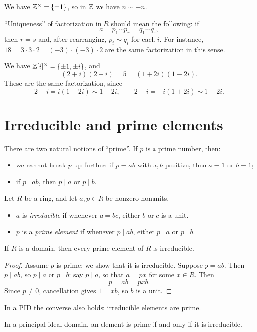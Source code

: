 \documentclass[reqno,11pt]{amsart}
\begin{document}
\begin{example}
We have $\mathbb{Z}^\times=\{\pm1\}$, so in $\mathbb{Z}$ we have $n\sim-n$.
\end{example}

``Uniqueness'' of factorization in $R$ should mean the following:
if
\[
  a=p_1\cdots p_r=q_1\cdots q_s,
\]
then $r=s$ and, after rearranging, $p_i\sim q_i$ for each $i$.
For instance, $18=3\cdot3\cdot2=(-3)\cdot(-3)\cdot2$ are the
same factorization in this sense.

\begin{example}
We have $\mathbb{Z}[i]^\times=\{\pm1,\pm i\}$, and
\[
  (2+i)(2-i)=5=(1+2i)(1-2i).
\]
These are the same factorization, since
\[
  2+i=i(1-2i)\sim1-2i,\qquad 2-i=-i(1+2i)\sim1+2i.
\]
\end{example}

\section{Irreducible and prime elements}

There are two natural notions of ``prime''. If $p$ is a prime
number, then:
\begin{itemize}
  \item we cannot break $p$ up further: if $p=ab$ with $a,b$
  positive, then $a=1$ or $b=1$;
  \item if $p\mid ab$, then $p\mid a$ or $p\mid b$.
\end{itemize}

\begin{define}
Let $R$ be a ring, and let $a,p\in R$ be nonzero nonunits.
\begin{itemize}
  \item $a$ is \emph{irreducible} if whenever $a=bc$, either $b$ or
  $c$ is a unit.
  \item $p$ is a \emph{prime element} if whenever $p\mid ab$,
  either $p\mid a$ or $p\mid b$.
\end{itemize}
\end{define}

\begin{lemma}\label{lem:prime-irred}
If $R$ is a domain, then every prime element of $R$ is irreducible.
\end{lemma}
\begin{proof}
Assume $p$ is prime; we show that it is irreducible. Suppose $p=ab$.
Then $p\mid ab$, so $p\mid a$ or $p\mid b$; say $p\mid a$, so that
$a=px$ for some $x\in R$. Then
\[
  p=ab=pxb.
\]
Since $p\neq0$, cancellation gives $1=xb$, so $b$ is a unit.
\end{proof}

In a PID the converse also holds: irreducible elements are prime.

\begin{theorem}\label{thm:pid-irred-prime}
In a principal ideal domain, an element is prime if and only if it
is irreducible.
\end{theorem}
\end{document}
